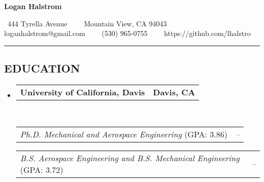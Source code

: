 \documentclass[10pt,letterpaper,MMMyyyy,nonstop]{simpleresumecv}
\makeatletter
\newcommand{\CVAuthor}{Logan Halstrom}
\newcommand{\CVWebpage}{https://github.com/lhalstro}
\newcommand{\CVEmail}{loganhalstrom@gmail.com}
\newcommand{\CVPhone}{(530) 965-0755}
\newcommand{\CVAddressStreet}{444 Tyrella Avenue}
\newcommand{\CVAddressCity}{Mountain View, CA 94043}
\newcommand{\headerrow}[2]
{\begin{tabular*}{\linewidth}{l@{\extracolsep{\fill}}r}
    #1 &
    #2 \\
\end{tabular*}}
\makeatother
\begin{document}

\begin{center}
    {\huge \textbf{\CVAuthor}}

    \ \CVAddressStreet\ \ \textbullet
    \ \ \CVAddressCity
    \\
    \hspace{1.7em} \CVEmail\ \ \textbullet
               \ \ \CVPhone\ \ \textbullet
               \ \ \CVWebpage
\end{center}



\hrule
\vspace{-0.4em}
\subsection*{EDUCATION}

\begin{itemize}
    \parskip=0.1em

    \item
        \headerrow
        {\textbf{University of California, Davis}}
        {\textbf{Davis, CA}}
        \\
        \headerrow
        {\emph{Ph.D. Mechanical and Aerospace Engineering} (GPA: 3.86)}
        {\emph{\DatestampYMD{2013}{09}{15} -- \DatestampYMD{2020}{09}{15}} }

          \headerrow
          {\emph{B.S. Aerospace Engineering and B.S. Mechanical Engineering} (GPA: 3.72)}
          {\emph{\DatestampYMD{2008}{09}{15} -- \DatestampYMD{2013}{06}{15}} }

\end{itemize}
\end{document}
